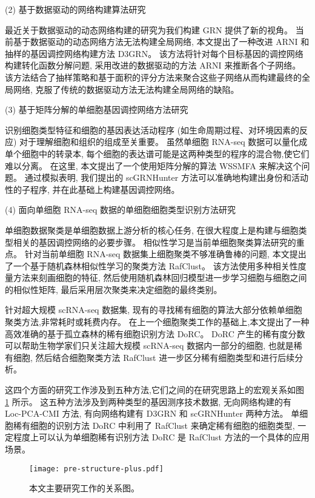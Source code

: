 (2) 基于数据驱动的网络构建算法研究

最近关于数据驱动的动态网络构建的研究为我们构建 GRN 提供了新的视角。
当前基于数据驱动的动态网络方法无法构建全局网络,
本文提出了一种改进 ARNI 和抽样的基因调控网络构建方法 D3GRN。
该方法将针对每个目标基因的调控网络构建转化函数分解问题,
采用改进的数据驱动的方法 ARNI 来推断各个子网络。
该方法结合了抽样策略和基于面积的评分方法来聚合这些子网络从而构建最终的全局网络,
克服了传统的数据驱动方法无法构建全局网络的缺陷。

(3) 基于矩阵分解的单细胞基因调控网络方法研究

识别细胞类型特征和细胞的基因表达活动程序 (如生命周期过程、对环境因素的反应) 对于理解细胞和组织的组成至关重要。
虽然单细胞 RNA-seq 数据可以量化成单个细胞中的转录本,
每个细胞的表达谱可能是这两种类型的程序的混合物,使它们难以分离。
在这里, 本文提出了一个使用矩阵分解的算法 WSSMFA 来解决这个问题。
通过模拟表明, 我们提出的 scGRNHunter 方法可以准确地构建出身份和活动性的子程序, 
并在此基础上构建基因调控网络。


(4) 面向单细胞 RNA-seq 数据的单细胞细胞类型识别方法研究

单细胞数据聚类是单细胞数据上游分析的核心任务, 
在很大程度上是构建与细胞类型相关的基因调控网络的必要步骤。
相似性学习是当前单细胞聚类算法研究的重点。
针对当前单细胞 RNA-seq 数据集上细胞聚类不够准确鲁棒的问题,
本文提出了一个基于随机森林相似性学习的聚类方法 RafClust。
该方法使用多种相关性度量方法来刻画细胞的特征, 
然后使用随机森林回归模型进一步学习细胞与细胞之间的相似性矩阵,
最后采用层次聚类来决定细胞的最终类别。

针对超大规模 scRNA-seq 数据集,
现有的寻找稀有细胞的算法大部分依赖单细胞聚类方法,非常耗时或耗费内存。
在上一个细胞聚类工作的基础上,本文提出了一种高效准确的基于孤立森林的稀有细胞识别方法 DoRC。
DoRC 产生的稀有度分数可以帮助生物学家们只关注超大规模 scRNA-seq 数据内一部分的细胞, 也就是稀有细胞,
然后结合细胞聚类方法 RafClust 进一步区分稀有细胞类型和进行后续分析。

这四个方面的研究工作涉及到五种方法,它们之间的在研究思路上的宏观关系如图 \ref{fig:pre-structure} 所示。
这五种方法涉及到两种类型的基因测序技术数据, 无向网络构建的有 Loc-PCA-CMI 方法, 有向网络构建有 D3GRN 和 scGRNHunter 两种方法。 
单细胞稀有细胞的识别方法 DoRC 中利用了 RafClust 来确定稀有细胞的细胞类型,
一定程度上可以认为单细胞稀有识别方法 DoRC 是 RafClust 方法的一个具体的应用场景。
\begin{figure}[!htbp]
    \centering
    \texttt{[image: pre-structure-plus.pdf]}
    \caption{本文主要研究工作的关系图。}
    \label{fig:pre-structure}
\end{figure}

